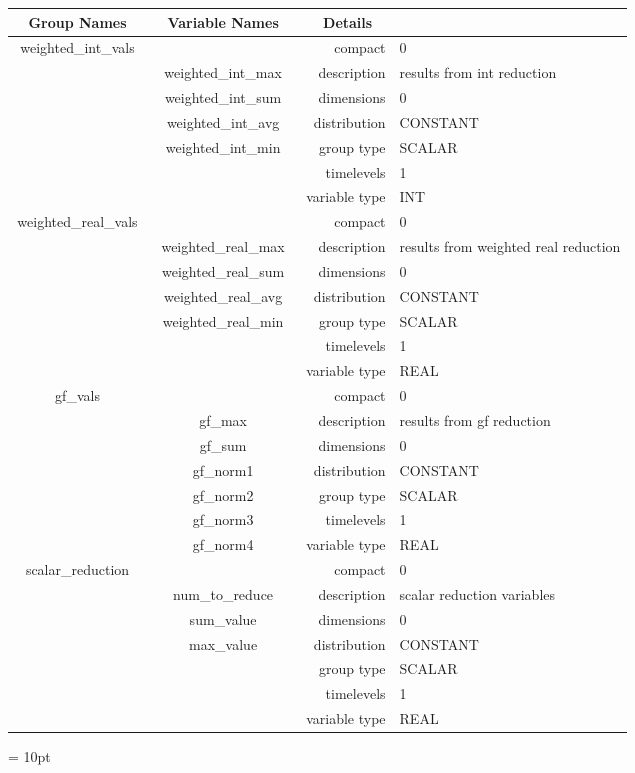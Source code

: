 \begin{tabular*}{150mm}{|c|c@{\extracolsep{\fill}}|rl|} \hline 
~ {\bf Group Names} ~ & ~ {\bf Variable Names} ~  &{\bf Details} ~ & ~ \\ 
\hline 
weighted\_int\_vals &  & compact & 0 \\ 
 & weighted\_int\_max & description & results from int reduction \\ 
 & weighted\_int\_sum & dimensions & 0 \\ 
 & weighted\_int\_avg & distribution & CONSTANT \\ 
 & weighted\_int\_min & group type & SCALAR \\ 
 &  & timelevels & 1 \\ 
 &  & variable type & INT \\ 
\hline 
weighted\_real\_vals &  & compact & 0 \\ 
 & weighted\_real\_max & description & results from weighted real reduction \\ 
 & weighted\_real\_sum & dimensions & 0 \\ 
 & weighted\_real\_avg & distribution & CONSTANT \\ 
 & weighted\_real\_min & group type & SCALAR \\ 
 &  & timelevels & 1 \\ 
 &  & variable type & REAL \\ 
\hline 
gf\_vals &  & compact & 0 \\ 
 & gf\_max & description & results from gf reduction \\ 
 & gf\_sum & dimensions & 0 \\ 
 & gf\_norm1 & distribution & CONSTANT \\ 
 & gf\_norm2 & group type & SCALAR \\ 
 & gf\_norm3 & timelevels & 1 \\ 
 & gf\_norm4 & variable type & REAL \\ 
\hline 
scalar\_reduction &  & compact & 0 \\ 
 & num\_to\_reduce & description & scalar reduction variables \\ 
 & sum\_value & dimensions & 0 \\ 
 & max\_value & distribution & CONSTANT \\ 
 &  & group type & SCALAR \\ 
 &  & timelevels & 1 \\ 
 &  & variable type & REAL \\ 
\hline 
\end{tabular*} 



\vspace{5mm}\parskip = 10pt 
